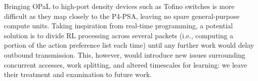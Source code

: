 \documentclass[
sigconf,natbib=false
]{acmart}
\newcommand{\approachshort}{OPaL}
\begin{document}
Bringing \approachshort{} to high-port density devices such as Tofino switches is more difficult as they map closely to the P4-PSA, leaving no spare general-purpose compute units.
Taking inspiration from real-time programming, a potential solution is to divide RL processing across several packets (i.e., computing a portion of the action preference list each time) until any further work would delay outbound transmission.
This, however, would introduce new issues surrounding concurrent accesses, work splitting, and altered timescales for learning: we leave their treatment and examination to future work.

%
\end{document}
